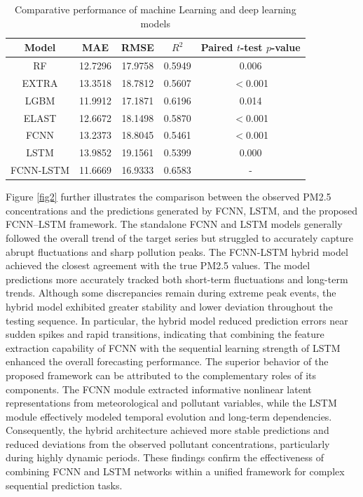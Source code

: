 \documentclass[twoside]{article}
\begin{document}
\begin{table}[h]
\begin{center}
\small
\caption{Comparative performance of machine Learning and deep learning models}\label{tab3}
\begin{tabular}{|c|cccc|}
  \hline
  Model & MAE & RMSE& $R^{2}$& Paired $t$-test $p$-value\\  \hline \hline
  RF & 12.7296 &17.9758&0.5949& 0.006 \\
 EXTRA& 13.3518 & 18.7812 & 0.5607& $<$0.001 \\
  LGBM & 11.9912 & 17.1871 & 0.6196& 0.014  \\  
  ELAST &12.6672 & 18.1498 & 0.5870& $<$0.001  \\  
  FCNN & 13.2373 & 18.8045 &0.5461&  $<$0.001 \\  
 LSTM & 13.9852 & 19.1561 & 0.5399& 0.000 \\   
  FCNN-LSTM &11.6669 & 16.9333&0.6583 &-\\    \hline
\end{tabular}
\end{center}
\end{table}


Figure \ref{fig2} further illustrates the comparison between the observed PM2.5 concentrations and the predictions generated by FCNN, LSTM, and the proposed FCNN–LSTM framework. The standalone FCNN and LSTM models generally followed the overall trend of the target series but struggled to accurately capture abrupt fluctuations and sharp pollution peaks. The FCNN-LSTM hybrid model achieved the closest agreement with the true PM2.5 values. The model predictions more accurately tracked both short-term fluctuations and long-term trends. Although some discrepancies remain during extreme peak events, the hybrid model exhibited greater stability and lower deviation throughout the testing sequence. In particular, the hybrid model reduced prediction errors near sudden spikes and rapid transitions, indicating that combining the feature extraction capability of FCNN with the sequential learning strength of LSTM enhanced the overall forecasting performance. 
The superior behavior of the proposed framework can be attributed to the complementary roles of its components. The FCNN module extracted informative nonlinear latent representations from meteorological and pollutant variables, while the LSTM module effectively modeled temporal evolution and long-term dependencies. Consequently, the hybrid architecture achieved more stable predictions and reduced deviations from the observed pollutant concentrations, particularly during highly dynamic periods. These findings confirm the effectiveness of combining FCNN and LSTM networks within a unified framework for complex sequential prediction tasks. 
\end{document}
